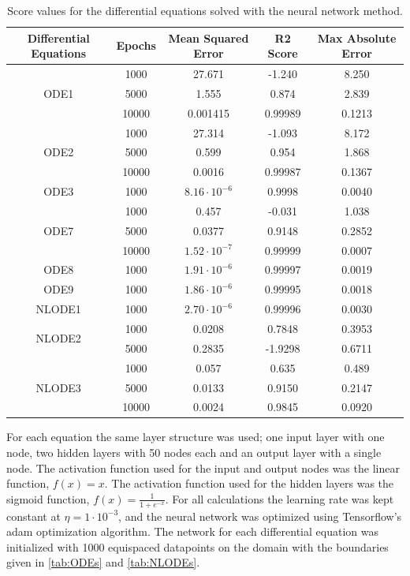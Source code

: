 \documentclass[aps,reprint,superscriptaddress,nofootinbib]{revtex4-2}
\begin{document}
\begin{table}[htp]
    \centering
    \caption{Score values for the differential equations solved with the neural network method. }
    \begin{tabular}{c|c|c|c|c}
    Differential Equations & Epochs & Mean Squared Error & R2 Score & Max Absolute Error \\
    \hline
    \hline
    \multirow{3}{*}{ODE1} & 1000 & 27.671 & -1.240 & 8.250 \\
     & 5000 & 1.555 & 0.874 & 2.839 \\
     & 10000 & 0.001415 & 0.99989 & 0.1213 \\
     \hline
    \multirow{3}{*}{ODE2} & 1000 & 27.314 & -1.093 & 8.172 \\
    & 5000 & 0.599 & 0.954 & 1.868 \\
    & 10000 & 0.0016 & 0.99987 & 0.1367 \\
    \hline
    ODE3 & 1000 & $8.16 \cdot 10^{-6}$ & 0.9998 & 0.0040 \\
    \hline
    \multirow{3}{*}{ODE7} & 1000 & 0.457 & -0.031 & 1.038 \\
    & 5000 & 0.0377 & 0.9148 & 0.2852 \\
    & 10000 & $1.52 \cdot 10^{-7}$ & 0.99999 & 0.0007 \\
    \hline
    ODE8 & 1000 & $1.91 \cdot 10^{-6}$ & 0.99997 & 0.0019 \\
    \hline
    ODE9 & 1000 & $1.86 \cdot 10^{-6}$ & 0.99995 & 0.0018 \\
    \hline
    NLODE1 & 1000 & $2.70\cdot10^{-6}$ & 0.99996 & 0.0030 \\
    \hline
    \multirow{2}{*}{NLODE2} & 1000 & 0.0208 & 0.7848 & 0.3953 \\
    & 5000 & 0.2835 & -1.9298 & 0.6711 \\
    \hline
    \multirow{3}{*}{NLODE3} & 1000 & 0.057 & 0.635 & 0.489 \\
    & 5000 & 0.0133 & 0.9150 & 0.2147 \\
    & 10000 & 0.0024 & 0.9845 & 0.0920
    \end{tabular}
    \label{tab:nn_diffeqs}
\end{table}

    For each equation the same layer structure was used; one input layer with one node, two hidden layers with 50 nodes each and an output layer with a single node. The activation function used for the input and output nodes was the linear function, $f(x) = x$. The activation function used for the hidden layers was the sigmoid function, $f(x) = \frac{1}{1+e^{-x}}$. For all calculations the learning rate was kept constant at $\eta = 1\cdot10^{-3}$, and the neural network was optimized using Tensorflow's adam optimization algorithm. The network for each differential equation was initialized with 1000 equispaced datapoints on the  domain with the boundaries given in \ref{tab:ODEs} and \ref{tab:NLODEs}.
    
\end{document}
